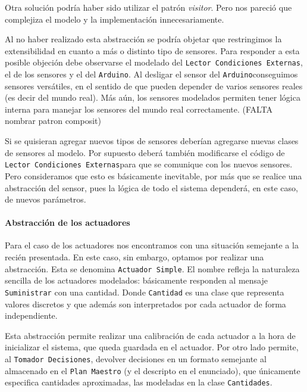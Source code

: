 \documentclass{article}
\newcommand{\condiciones}{\texttt{Lector Condiciones Externas}}
\newcommand{\decisiones}{\texttt{Tomador Decisiones}}
\newcommand{\arduino}{\texttt{Arduino}}
\begin{document}
    Otra soluci\'on podr\'ia haber sido utilizar el patr\'on \textit{visitor}.
    Pero nos pareci\'o que complejiza el modelo y la implementaci\'on innecesariamente.

    Al no haber realizado esta abstracci\'on se podr\'ia objetar que restringimos
    la extensibilidad en cuanto a m\'as o distinto tipo de sensores.
    Para responder a esta posible objeci\'on debe observarse el modelado del
    \condiciones, el de los sensores y el del
    \arduino. Al desligar el sensor del \arduino conseguimos
    sensores vers\'atiles, en el sentido de que pueden depender de varios sensores
    reales (es decir del mundo real). M\'as a\'un, los sensores modelados
    permiten tener l\'ogica interna para manejar los sensores del mundo real
    correctamente.
    (FALTA nombrar patron composit)

    Si se quisieran agregar nuevos tipos de sensores deber\'ian agregarse nuevas
    clases de sensores al modelo. Por supuesto deber\'a tambi\'en modificarse
    el c\'odigo de \condiciones para que se comunique
    con los nuevos sensores. Pero consideramos que esto es b\'asicamente inevitable,
    por m\'as que se realice una abstracci\'on del sensor, pues la l\'ogica
    de todo el sistema depender\'a, en este caso, de nuevos par\'ametros.

    \paragraph{Abstracci\'on de los actuadores}
    Para el caso de los actuadores nos encontramos con una situaci\'on semejante
    a la reci\'en presentada. En este caso, sin embargo, optamos por realizar
    una abstracci\'on. Esta se denomina \texttt{Actuador Simple}. El nombre
    refleja la naturaleza sencilla de los actuadores modelados: b\'asicamente
    responden al mensaje \texttt{Suministrar} con una cantidad. Donde
    \texttt{Cantidad} es una clase que representa valores discretos y que adem\'as
    son interpretados por cada actuador de forma independiente.

    Esta abstracci\'on permite realizar una calibraci\'on de cada actuador a la
    hora de inicializar el sistema, que queda
    guardada en el actuador. Por otro lado permite, al \decisiones,
    devolver decisiones en un formato semejante al almacenado en el
    \texttt{Plan Maestro} (y el descripto en el enunciado), que \'unicamente
    especifica cantidades aproximadas, las modeladas en la clase
    \texttt{Cantidades}.
\end{document}
